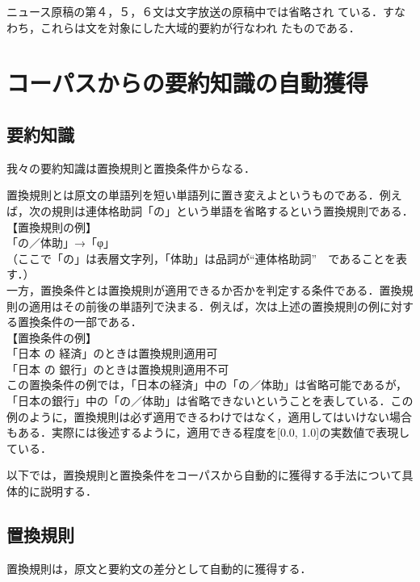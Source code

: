 ニュース原稿の第４，５，６文は文字放送の原稿中では省略され
ている．すなわち，これらは文を対象にした大域的要約が行なわれ
たものである．

\section{コーパスからの要約知識の自動獲得}
\label{sec:sec4}
\subsection{要約知識}
\label{sec:sec4-1}
我々の要約知識は置換規則と置換条件からなる．

置換規則とは原文の単語列を短い単語列に置き変えよというものである．例えば，次の規則は連体格助詞「の」という単語を省略するという置換規則である．\vspace{8mm}\\
\hspace*{5mm}【置換規則の例】\\
\hspace*{10mm}「の／体助」→「φ」\\
\hspace*{10mm}（ここで「の」は表層文字列，「体助」は品詞が“連体格助詞”　であることを表す．）\vspace{8mm}\\
一方，置換条件とは置換規則が適用できるか否かを判定する条件である．置換規則の適用はその前後の単語列で決まる．例えば，次は上述の置換規則の例に対する置換条件の一部である．\vspace{8mm}\\
\hspace*{5mm}【置換条件の例】\\
\hspace*{10mm}「日本 の 経済」のときは置換規則適用可\\
\hspace*{10mm}「日本 の 銀行」のときは置換規則適用不可 \vspace{8mm}\\
この置換条件の例では，「日本の経済」中の「の／体助」は省略可能であるが，「日本の銀行」中の「の／体助」は省略できないということを表している．この例のように，置換規則は必ず適用できるわけではなく，適用してはいけない場合もある．実際には後述するように，適用できる程度を[0.0, 1.0]の実数値で表現している．

以下では，置換規則と置換条件をコーパスから自動的に獲得する手法について具体的に説明する．
\subsection{置換規則}
\label{sec:sec4-2}
置換規則は，原文と要約文の差分として自動的に獲得する．

